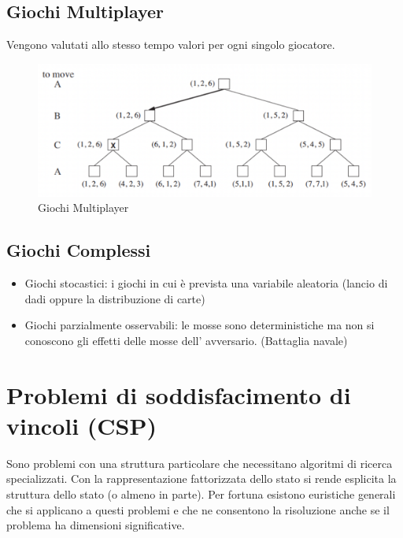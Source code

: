 \documentclass{article}
\begin{document}
\subsection{Giochi Multiplayer}
Vengono valutati allo stesso tempo valori per ogni singolo giocatore.
\begin{figure}[h!]
\centering
\includegraphics[scale=0.35]{Images/giochimultiplayer.png}
\caption{Giochi Multiplayer}
\end{figure}

\subsection{Giochi Complessi}
\begin{itemize}
    \item Giochi stocastici: i giochi in cui è prevista una variabile aleatoria (lancio di dadi oppure la distribuzione di carte)
    \item Giochi parzialmente osservabili: le mosse sono deterministiche ma non si conoscono gli effetti delle mosse dell' avversario. (Battaglia navale)
\end{itemize}

\section{Problemi di soddisfacimento di vincoli (CSP)}
Sono problemi con una struttura particolare che necessitano algoritmi di ricerca specializzati. Con la rappresentazione fattorizzata dello stato si rende esplicita la struttura dello stato (o almeno in parte). Per fortuna esistono euristiche generali che si applicano a questi problemi e che ne consentono la risoluzione anche se il problema ha dimensioni significative.
\end{document}
